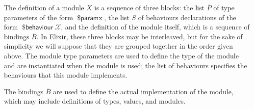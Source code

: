 \documentclass[a4paper,10pt]{article}
\DeclareMathOperator{\kwbvr}{\textsf{\$behaviour}}
\DeclareMathOperator{\kwprm}{\textsf{\$param}}
\newcommand{\tx}{\textrm{x}}
\newcommand{\BX}{\ensuremath{\mathcal{X}}}
\begin{document}
The definition of a module $X$ is a sequence of three blocks: the list $\overline P$ of type parameters of the form $\kwprm \tx$, the list $\overline S$ of behaviours declarations of the form  $\kwbvr \BX$, and the definition of the module itself, which is a sequence of bindings $\overline{B}$. In Elixir, these three blocks may be interleaved, but for the sake of simplicity we will suppose that they are grouped together in the order given above. The module type parameters are used to define the type of the module and are instantiated when the module is used; the list of behaviours specifies the behaviours that this module implements. 

The bindings $\overline{B}$ are used to define the actual implementation of the module, which may include definitions of types, values, and modules.
\end{document}
